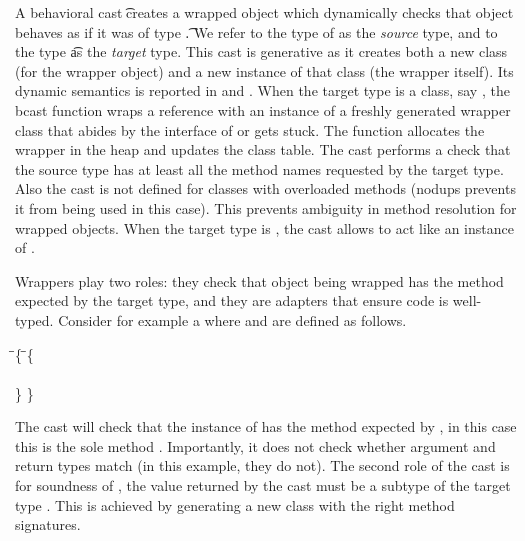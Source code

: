 \documentclass[runnningheads]{tex/llncs}
\begin{document}
A behavioral cast \BehCast\t\a creates a wrapped object \ap which
dynamically checks that object \a behaves as if it was of type \t.  We refer
to the type of \a as the \emph{source} type, and to the type \t as the
\emph{target} type. This cast is generative as it creates both a new class
(for the wrapper object) and a new instance of that class (the wrapper
itself). Its dynamic semantics is reported in  and
.  When the target type is a class, say \Cp, the bcast function
wraps a reference \a with an instance of a freshly generated wrapper class
\D that abides by the interface of \Cp or gets stuck. The function allocates
the wrapper in the heap and updates the class table.  The cast performs a
check that the source type has at least all the method names requested by
the target type.  Also the cast is not defined for classes with overloaded
methods (\textsf{nodups} prevents it from being used in this case).  This
prevents ambiguity in method resolution for wrapped objects. When the target
type is \any, the cast allows \a to act like an instance of \any.

Wrappers play two roles: they check that object being wrapped has the method
expected by the target type, and they are adapters that ensure \kafka code
is well-typed. Consider for example a \EM{\BehCast\D\New\C{}} where \C and
\D are defined as follows.

\begin{tabbing}
\hspace{1cm}\= \class\= \C \{    \hspace{3cm}\=  \class\=  \D \{\\
   \>  \> \Mdef\m\x\any\any\x   \>        \>  \Mdef\m\x\D\D\x\\
   \>  \}  \> \>                         \}
\end{tabbing}

\noindent
The cast will check that the instance of \C has the method expected by \D,
in this case this is the sole method \m.  Importantly, it does not check
whether argument and return types match (in this example, they do not). 
The second role of the cast is for soundness of \kafka, the value 
returned by the cast must be a subtype of the target type \D. This is 
achieved by generating a new class with the right method signatures.
\end{document}
